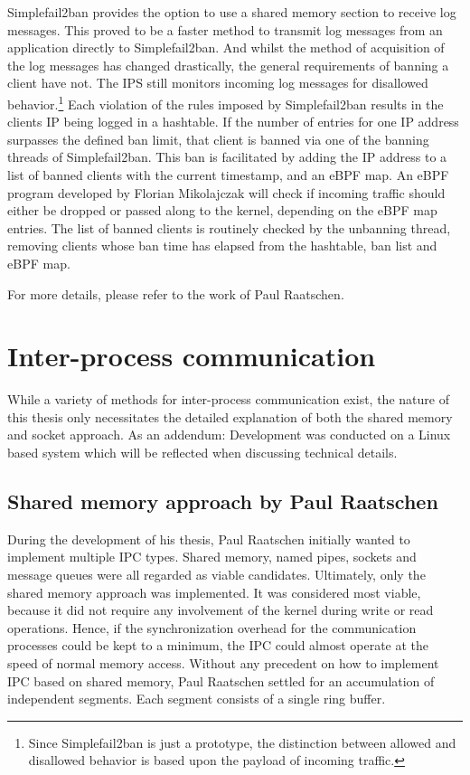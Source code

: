 Simplefail2ban provides the option to use a shared memory section to receive log messages.
This proved to be a faster method to transmit log messages from an application directly to Simplefail2ban.
And whilst the method of acquisition of the log messages has changed drastically, the general requirements of banning a client have not.
The \ac{IPS} still monitors incoming log messages for disallowed behavior.\footnote{Since Simplefail2ban is just a prototype, the distinction between allowed and disallowed behavior is based upon the payload of incoming traffic.}
Each violation of the rules imposed by Simplefail2ban results in the clients \ac{IP} being logged in a hashtable.
If the number of entries for one \ac{IP} address surpasses the defined ban limit, that client is banned via one of the banning threads of Simplefail2ban.
This ban is facilitated by adding the \ac{IP} address to a list of banned clients with the current timestamp, and an \ac{eBPF} map.
An \ac{eBPF} program developed by Florian Mikolajczak will check if incoming traffic should either be dropped or passed along to the kernel, depending on the \ac{eBPF} map entries.
The list of banned clients is routinely checked by the unbanning thread, removing clients whose ban time has elapsed from the hashtable, ban list and \ac{eBPF} map.

For more details, please refer to the work of Paul Raatschen\cite{raatschen:ipc}.

\section{Inter-process communication}
While a variety of methods for inter-process communication exist, the nature of this thesis only necessitates the detailed explanation of both the shared memory and socket approach.
As an addendum\@: Development was conducted on a Linux based system which will be reflected when discussing technical details.

\subsection{Shared memory approach by Paul Raatschen}
During the development of his thesis, Paul Raatschen initially wanted to implement multiple \ac{IPC} types.
Shared memory, named pipes, sockets and message queues were all regarded as viable candidates.
Ultimately, only the shared memory approach was implemented.
It was considered most viable, because it did not require any involvement of the kernel during write or read operations.
Hence, if the synchronization overhead for the communication processes could be kept to a minimum, the \ac{IPC} could almost operate at the speed of normal memory access.
Without any precedent on how to implement \ac{IPC} based on shared memory, Paul Raatschen settled for an accumulation of independent segments.
Each segment consists of a single ring buffer.\cite{raatschen:ipc}

